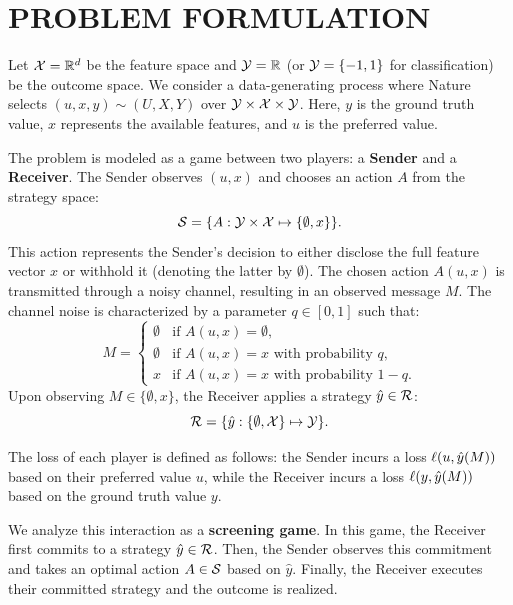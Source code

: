 \section{PROBLEM FORMULATION}
\label{sec:problem_formulation}

Let $\mathcal{X} = \mathbb{R}^d$ be the feature space and $\mathcal{Y} = \mathbb{R}$ (or $\mathcal{Y} = \{-1, 1\}$ for classification) be the outcome space. We consider a data-generating process where Nature selects $(u, x, y) \sim (U, X, Y)$ over $\mathcal{Y} \times \mathcal{X} \times \mathcal{Y}$. Here, $y$ is the ground truth value, $x$ represents the available features, and $u$ is the preferred value.

The problem is modeled as a game between two players: a \textbf{Sender} and a \textbf{Receiver}. The Sender observes $(u, x)$ and chooses an action $A$ from the strategy space:
\begin{equation*}
  \mathcal{S} = \{ A : \mathcal{Y} \times \mathcal{X} \mapsto \{\emptyset, x\} \}.
\end{equation*}
This action represents the Sender's decision to either disclose the full feature vector $x$ or withhold it (denoting the latter by $\emptyset$). The chosen action $A(u, x)$ is transmitted through a noisy channel, resulting in an observed message $M$. The channel noise is characterized by a parameter $q \in [0, 1]$ such that:
\begin{equation*}
  M = \begin{cases}
  \emptyset & \text{if } A(u,x) = \emptyset, \\
  \emptyset & \text{if } A(u,x) = x \text{ with probability } q, \\
  x & \text{if } A(u,x) = x \text{ with probability } 1-q.
  \end{cases}
\end{equation*}
Upon observing $M \in \{\emptyset, x\}$, the Receiver applies a strategy $\hat{y} \in \mathcal{R}$:
\begin{equation*}
  \mathcal{R} = \{ \hat{y} : \{\emptyset, \mathcal{X}\} \mapsto \mathcal{Y} \}.
\end{equation*}

The loss of each player is defined as follows: the Sender incurs a loss $\ell(u, \hat{y}(M))$ based on their preferred value $u$, while the Receiver incurs a loss $\ell(y, \hat{y}(M))$ based on the ground truth value $y$. 

We analyze this interaction as a \textbf{screening game}. In this game, the Receiver first commits to a strategy $\hat{y} \in \mathcal{R}$. Then, the Sender observes this commitment and takes an optimal action $A \in \mathcal{S}$ based on $\hat{y}$. Finally, the Receiver executes their committed strategy and the outcome is realized.

